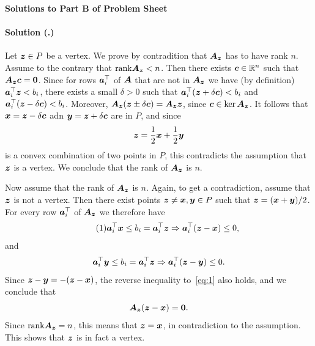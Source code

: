 \documentclass{article}
\newcounter{problemSheetNumber}
\newcounter{problems}
\renewcommand{\solution}[1]{\paragraph{Solution (\theproblemSheetNumber.\theproblems)}\addtocounter{problems}{1}\label{#1}}
\begin{document}
 
\begin{center}
{\Large {\bf Solutions to Part B of Problem Sheet \theproblemSheetNumber}}
\end{center}

\solution{pr:1}
Let $\bm{z}\in P$ be a vertex. We prove by contradition that $\bm{A}_{\bm{z}}$ has to have rank $n$. Assume to the contrary that $\mathrm{rank} \bm{A}_{\bm{z}}<n$. Then there exists $\bm{c}\in \mathbb{R}^n$ such that $\bm{A}_{\bm{z}}\bm{c}=\bm{0}$. Since for rows $\bm{a}_i^{\top}$ of $\bm{A}$ that are not in $\bm{A}_{\bm{z}}$ we have (by definition) $\bm{a}_i^{\top}\bm{z}<b_i$, there exists a small $\delta>0$ such that $\bm{a}_i^{\top}(\bm{z}+\delta \bm{c})<b_i$ and $\bm{a}_i^{\top}(\bm{z}-\delta \bm{c})<b_i$. Moreover, $\bm{A}_{\bm{z}}(\bm{z}\pm \delta \bm{c})=\bm{A}_{\bm{z}}\bm{z}$, since $\bm{c}\in \ker \bm{A}_{\bm{z}}$. It follows that $\bm{x}=\bm{z}-\delta\bm{c}$ adn $\bm{y}=\bm{z}+\delta\bm{c}$ are in $P$, and since
\begin{equation*}
 \bm{z} = \frac{1}{2}\bm{x}+\frac{1}{2}\bm{y}
\end{equation*}
is a convex combination of two points in $P$, this contradicts the assumption that $\bm{z}$ is a vertex. We conclude that the rank of $\bm{A}_{\bm{z}}$ is $n$. 

Now assume that the rank of $\bm{A}_{\bm{z}}$ is $n$. Again, to get a contradiction, assume that $\bm{z}$ is not a vertex. Then there exist points $\bm{z}\neq \bm{x},\bm{y}\in P$ such that $\bm{z}=(\bm{x}+\bm{y})/2$. For every row $\bm{a}_i^{\top}$ of $\bm{A}_{\bm{z}}$ we therefore have
\begin{equation}\label{eq:1}\tag{1}
 \bm{a}_i^{\top}\bm{x}\leq b_i=\bm{a}_i^{\top}\bm{z} \Rightarrow \bm{a}_i^{\top}(\bm{z}-\bm{x})\leq 0,
\end{equation}
and
\begin{equation*}
 \bm{a}_i^{\top}\bm{y}\leq b_i=\bm{a}_i^{\top}\bm{z} \Rightarrow \bm{a}_i^{\top}(\bm{z}-\bm{y})\leq 0.
\end{equation*}
Since $\bm{z}-\bm{y}=-(\bm{z}-\bm{x})$, the reverse inequality to~\eqref{eq:1} also holds, and we conclude that
\begin{equation*}
 \bm{A}_{\bm{z}}(\bm{z}-\bm{x})=\bm{0}.
\end{equation*}
Since $\mathrm{rank} \bm{A}_{\bm{z}}=n$, this means that $\bm{z}=\bm{x}$, in contradiction to the assumption. This shows that $\bm{z}$ is in fact a vertex.
\end{document}
